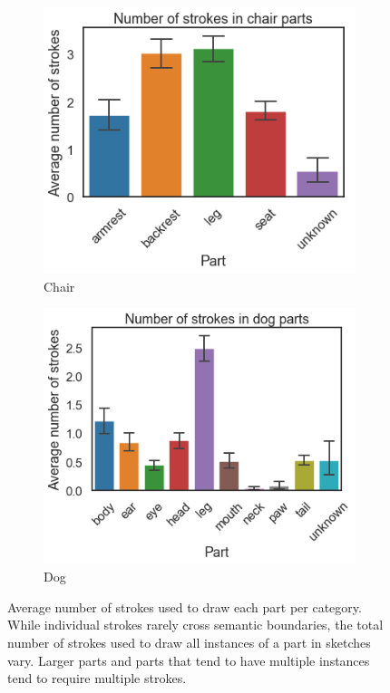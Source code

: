 \documentclass[10pt,letterpaper]{article}
\begin{document}
\begin{figure}[htbp]
\hfill
\begin{subfigure}[t]{0.2\textwidth}
\centering
\includegraphics[width=1.\textwidth]{figures/chair_average_parts.png}
\caption{Chair}
\end{subfigure}
 \hfill
\begin{subfigure}[t]{0.2\textwidth}
\centering
\includegraphics[width=1.\textwidth]{figures/dog_average_parts.png}
\caption{Dog}
\end{subfigure}
\caption{Average number of strokes used to draw each part per category. 
While individual strokes rarely cross semantic boundaries, the total number of strokes used to draw all instances of a part in sketches vary. 
Larger parts and parts that tend to have multiple instances tend to require multiple strokes.
}
\label{strokesperpart}
\end{figure}
\end{document}
